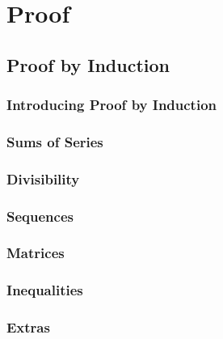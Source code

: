 \documentclass[../alevelmaths.tex]{subfiles}
\begin{document}
\chapter{Proof}
\section{Proof by Induction}
\subsection*{Introducing Proof by Induction}
\subsection*{Sums of Series}
\subsection*{Divisibility}
\subsection*{Sequences}
\subsection*{Matrices}
\subsection*{Inequalities}
\subsection*{Extras}
\end{document}
